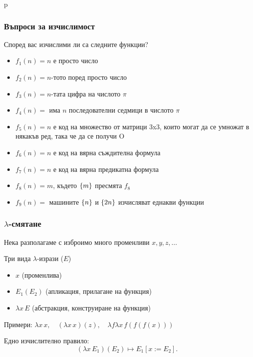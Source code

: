 p\documentclass{beamer}
\begin{document}
\begin{frame}
  \frametitle{Въпроси за изчислимост}

  Според вас изчислими ли са следните функции?
  \begin{itemize}[<+->]
  \item $f_1(n) = n$ е просто число
  \item $f_2(n) = n$-тото поред просто число
  \item $f_3(n) = n$-тата цифра на числото $\pi$
  \item $f_4(n) = $ има $n$ последователни седмици в числото $\pi$
  \item $f_5(n) = n$ е код на множество от матрици 3x3, които могат да се умножат в някакъв ред, така че да се получи O
  \item $f_6(n) = n$ е код на вярна съждителна формула
  \item $f_7(n) = n$ е код на вярна предикатна формула
  \item $f_8(n) = m$, където $\{m\}$ пресмята $f_8$
  \item $f_9(n) = $ машините $\{n\}$ и $\{2n\}$ изчисляват еднакви функции
  \end{itemize}
\end{frame}

\begin{frame}
  \frametitle{$\lambda$-смятане}

  Нека разполагаме с изброимо много променливи $x,y,z,\ldots$
  \vspace{1em}

  Три вида $\lambda$-изрази ($E$)
  \begin{itemize}
  \item $x$ (променлива)
  \item $E_1(E_2)$ (апликация, прилагане на функция)
  \item $\lambda x \, E$ (абстракция, конструиране на функция)
  \end{itemize}
  \vspace{1em}

  \pause

  Примери: $\lambda x\, x, \quad (\lambda x\, x)(z), \quad \lambda f\lambda x\, f(f(f(x)))$
  \vspace{1em}

  \pause

  Едно изчислително правило:
  \begin{equation*}
    (\lambda x\,E_1)(E_2) \mapsto E_1[x := E_2].
  \end{equation*}
\end{frame}
\end{document}
